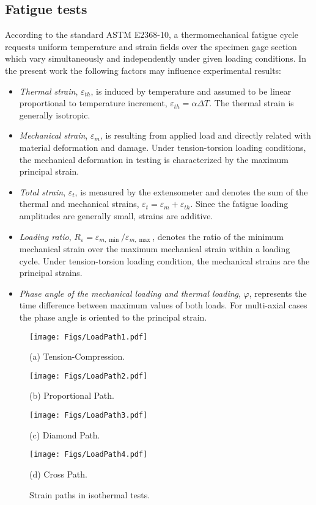 \documentclass[preprint,5p,twocolumn,11pt,sort&compress]{elsarticle}
\begin{document}
\subsection{Fatigue tests}
According to the standard ASTM E2368-10, a thermomechanical fatigue cycle requests uniform temperature and strain fields over the specimen gage section which vary simultaneously and independently under given loading conditions. In the present work the following factors may influence  experimental results:
\begin{itemize}
  \item {\em Thermal strain}, $\varepsilon_{th}$, is induced by temperature and assumed to be linear proportional to temperature increment, $\varepsilon_{th}=\alpha \Delta T$. The thermal strain is generally isotropic.
  \item {\em Mechanical strain}, $\varepsilon_{m}$, is resulting from applied load and directly related with material deformation and damage. Under tension-torsion loading conditions, the mechanical deformation in testing is characterized by the maximum principal strain.
  \item {\em Total strain}, $\varepsilon_t$, is measured by the extensometer and denotes the sum of the thermal and mechanical strains, $\varepsilon_t=\varepsilon_m+\varepsilon_{th}$. Since the fatigue loading amplitudes are generally small, strains are additive.
  \item {\em Loading ratio}, $ R_{\varepsilon}=\varepsilon_{m,\min}/\varepsilon_{m,\max}$, denotes the ratio of the minimum mechanical strain over the maximum mechanical strain within a loading cycle. Under tension-torsion loading condition, the mechanical strains are the principal strains.
  \item {\em Phase angle of the mechanical loading and thermal loading}, $\varphi$, represents the time difference between maximum values of both loads. For multi-axial cases the phase angle is oriented to the principal strain.
\end{itemize}


\begin{figure}
  \begin{minipage}[t]{0.5\linewidth}
  \nonumber
    \centering
    \texttt{[image: Figs/LoadPath1.pdf]}
    \centerline{\small (a) Tension-Compression.}
  \end{minipage}%
  \begin{minipage}[t]{0.5\linewidth}
    \centering
    \texttt{[image: Figs/LoadPath2.pdf]}
    \centerline{\small (b) Proportional Path.}
  \end{minipage}
  \begin{minipage}[t]{0.5\linewidth}
  \nonumber
    \centering
    \texttt{[image: Figs/LoadPath3.pdf]}
    \centerline{\small (c) Diamond Path.}
  \end{minipage}%
  \begin{minipage}[t]{0.5\linewidth}
    \centering
    \texttt{[image: Figs/LoadPath4.pdf]}
    \centerline{\small (d) Cross Path.}
  \end{minipage}
  \caption{Strain paths in isothermal tests.}
  \label{Fig:LoadPath}
\end{figure}
\end{document}
